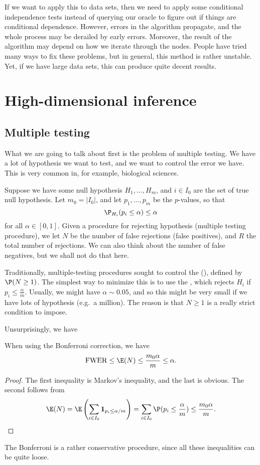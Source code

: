\documentclass[a4paper]{article}
\begin{document}
If we want to apply this to data sets, then we need to apply some conditional independence tests instead of querying our oracle to figure out if things are conditional dependence. However, errors in the algorithm propagate, and the whole process may be derailed by early errors. Moreover, the result of the algorithm may depend on how we iterate through the nodes. People have tried many ways to fix these problems, but in general, this method is rather unstable. Yet, if we have large data sets, this can produce quite decent results.

\section{High-dimensional inference}
\subsection{Multiple testing}
What we are going to talk about first is the problem of multiple testing. We have a lot of hypothesis we want to test, and we want to control the error we have. This is very common in, for example, biological sciences.

Suppose we have some null hypothesis $H_1, \ldots, H_m$, and $i \in I_0$ are the set of true null hypothesis. Let $m_0 = |I_0|$, and let $p_1, \ldots, p_m$ be the $p$-values, so that
\[
  \P_{H_i}(p_i \leq \alpha) \leq \alpha
\]
for all $\alpha \in [0, 1]$. Given a procedure for rejecting hypothesis (multiple testing procedure), we let $N$ be the number of false rejections (false positives), and $R$ the total number of rejections. We can also think about the number of false negatives, but we shall not do that here.

Traditionally, multiple-testing procedures sought to control the  (), defined by $\P(N \geq 1)$. The simplest way to minimize this is to use the , which rejects $H_i$ if $p_i \leq \frac{\alpha}{m}$. Usually, we might have $\alpha \sim 0.05$, and so this might be very small if we have lots of hypothesis (e.g.\ a million). The reason is that $N \geq 1$ is a really strict condition to impose.

Unsurprisingly, we have
\begin{thm}
  When using the Bonferroni correction, we have
  \[
    \mathrm{FWER} \leq \E(N) \leq \frac{m_0 \alpha}{m} \leq \alpha.
  \]
\end{thm}

\begin{proof}
  The first inequality is Markov's inequality, and the last is obvious. The second follows from
  \[
    \E(N) = \E \left(\sum_{i \in I_0} \mathbf{1}_{p_i \leq \alpha/m}\right) = \sum_{i \in I_0} \P(p_i \leq \frac{\alpha}{m}) \leq \frac{m_0 \alpha}{m}.
  \]
\end{proof}
The Bonferroni is a rather conservative procedure, since all these inequalities can be quite loose.
\end{document}
